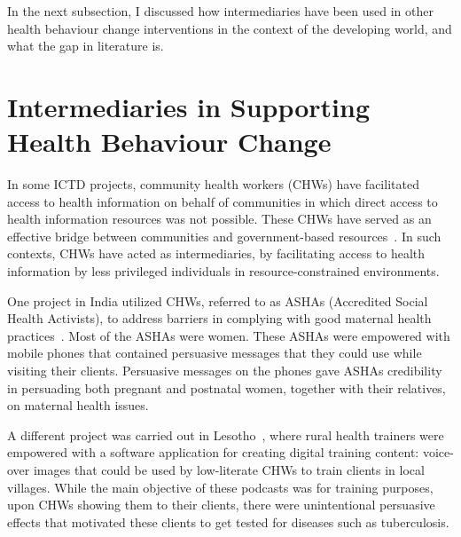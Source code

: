 In the next subsection, I discussed how intermediaries have been used in other health behaviour change interventions in the context of the developing world, and what the gap in literature is.

\section{Intermediaries in Supporting Health Behaviour Change}
In some ICTD projects, community health workers (CHWs) have facilitated access to health information on behalf of communities in which direct access to health information resources was not possible. These CHWs have served as an effective bridge between communities and government-based resources~\citep{katule2016leveraging}. In such contexts, CHWs have acted as intermediaries, by facilitating access to health information by less privileged individuals in resource-constrained environments.  

One project in India utilized CHWs, referred to as ASHAs (Accredited Social Health Activists), to address barriers in complying with good maternal health practices~\citep{ramachandran2010mobile,ramachandran2010research}. Most of the ASHAs were women. These ASHAs were empowered with mobile phones that contained persuasive messages that they could use while visiting their clients. Persuasive messages on the phones gave ASHAs credibility in persuading both pregnant and postnatal women, together with their relatives, on maternal health issues. 

A different project was carried out in Lesotho~\citep{molapo2013software}, where rural health trainers were empowered with a software application for creating digital  training  content: voice-over images  that could be used by low-literate CHWs to train clients in local villages. While the main objective of these podcasts was for training purposes, upon CHWs showing them to their clients, there were unintentional persuasive effects that motivated these clients to get tested for diseases such as tuberculosis.

